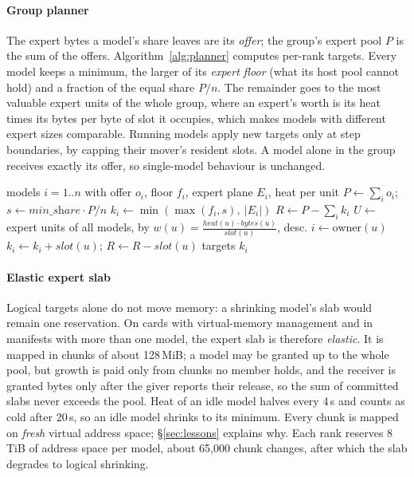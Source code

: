 \documentclass[10pt,conference,a4paper]{IEEEtran}
\newcommand{\MiB}{\,MiB}
\begin{document}
\paragraph{Group planner} The expert bytes a model's share leaves are its \emph{offer}; the group's
expert pool $P$ is the sum of the offers. Algorithm~\ref{alg:planner} computes per-rank targets.
Every model keeps a minimum, the larger of its \emph{expert floor} (what its host pool cannot hold)
and a fraction of the equal share $P/n$. The remainder goes to the most valuable expert units of the
whole group, where an expert's worth is its heat times its bytes per byte of slot it occupies,
which makes models with different expert sizes comparable. Running models apply new targets only
at step boundaries, by capping their mover's resident slots. A model alone in the group receives
exactly its offer, so single-model behaviour is unchanged.

\begin{algorithm}[t]
\caption{Expert budget per rank (GroupPlanner)}\label{alg:planner}
\small
\begin{algorithmic}[1]
\Require models $i=1..n$ with offer $o_i$, floor $f_i$, expert plane $E_i$, heat per unit
\State $P \gets \sum_i o_i$; \quad $s \gets \textit{min\_share}\cdot P/n$
  \State $k_i \gets \min(\max(f_i, s),\ |E_i|)$ 
\EndFor
\State $R \gets P - \sum_i k_i$
\State $U \gets$ expert units of all models, by $w(u)=\frac{\mathit{heat}(u)\cdot \mathit{bytes}(u)}{\mathit{slot}(u)}$, desc.
  \State $i \gets \mathrm{owner}(u)$
   
     \State $k_i \gets k_i + \mathit{slot}(u)$; \quad $R \gets R - \mathit{slot}(u)$
  \EndIf
\EndFor
\State \Return targets $k_i$ 
\end{algorithmic}
\end{algorithm}

\paragraph{Elastic expert slab} Logical targets alone do not move memory: a shrinking model's slab
would remain one reservation. On cards with virtual-memory management and in manifests with more
than one model, the expert slab is therefore \emph{elastic}. It is mapped in chunks of about
128\MiB; a model may be granted up to the whole pool, but growth is paid only from chunks no member
holds, and the receiver is granted bytes only after the giver reports their release, so the sum of
committed slabs never exceeds the pool. Heat of an idle model halves every 4\,s and counts as cold
after 20\,s, so an idle model shrinks to its minimum. Every chunk is mapped on \emph{fresh} virtual
address space; \S\ref{sec:lessons} explains why. Each rank reserves 8\,TiB of address space per
model, about 65{,}000 chunk changes, after which the slab degrades to logical shrinking.
\end{document}
